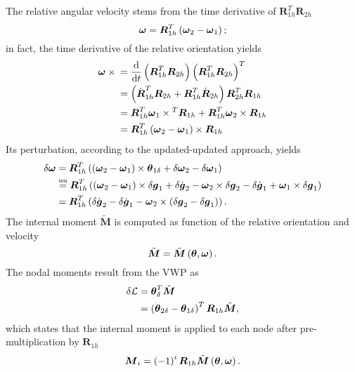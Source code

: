\documentclass[10pt,dvips,fleqn]{report}
\newcommand{\T}[1]{\boldsymbol{#1}}
\newcommand{\TT}[1]{\boldsymbol{#1}}
\newcommand{\equu}{\overset{\mathrm{uu}}{=}}
\begin{document}
The relative angular velocity stems from the time derivative
of $\TT{R}_{1h}^T\TT{R}_{2h}$
\begin{equation}
	\T{\omega} = \T{R}_{1h}^T\plbr{\T{\omega}_2 - \T{\omega}_1} ;
	\label{eq:deformable-hinge-attached-omega}
\end{equation}
in fact, the time derivative of the relative orientation yields
\begin{align}
	\T{\omega} \times{}
	&= \frac{\mathrm{d}}{\mathrm{d}t}\plbr{\T{R}_{1h}^T \T{R}_{2h}}\plbr{\T{R}_{1h}^T \T{R}_{2h}}^T \\
	&= \plbr{\dot{\T{R}}_{1h}^T \T{R}_{2h} + \T{R}_{1h}^T \dot{\T{R}}_{2h}} \T{R}_{2h}^T \T{R}_{1h} \\
	&= \T{R}_{1h}^T \T{\omega}_1 \times{}^T \T{R}_{1h} + \T{R}_{1h}^T \T{\omega}_2 \times \T{R}_{1h} \\
	&= \T{R}_{1h}^T \plbr{\T{\omega}_2 - \T{\omega}_1} \times \T{R}_{1h}
\end{align}
Its perturbation, according to the updated-updated approach, yields
\begin{align}
	\delta\T{\omega} &= \T{R}_{1h}^T\plbr{
		\plbr{\T{\omega}_2 - \T{\omega}_1} \times \T{\theta}_{1\delta}
		+ \delta\T{\omega}_2
		- \delta\T{\omega}_1
	} \\
	&\equu \T{R}_{1h}^T\plbr{
		\plbr{\T{\omega}_2 - \T{\omega}_1} \times \delta\T{g}_1
		+ \delta\dot{\T{g}}_2 - \T{\omega}_2 \times \delta\T{g}_2
		- \delta\dot{\T{g}}_1 + \T{\omega}_1 \times \delta\T{g}_1
	} \\
	&= \T{R}_{1h}^T\plbr{
		\delta\dot{\T{g}}_2
		- \delta\dot{\T{g}}_1
		- \T{\omega}_2 \times \plbr{\delta\T{g}_2 - \delta\T{g}_1}
	} .
\end{align}
The internal moment $\tilde{\T{M}}$ is computed as function
of the relative orientation and velocity
\begin{equation}
	\tilde{\T{M}} = \tilde{\T{M}}\plbr{\T{\theta}, \T{\omega}} .
\end{equation}
The nodal moments result from the VWP as
\begin{align}
	\delta\mathcal{L} &= \T{\theta}_{\delta}^T \tilde{\T{M}} \\
	&= \plbr{
		\T{\theta}_{2\delta} - \T{\theta}_{1\delta}
	}^T \T{R}_{1h} \tilde{\T{M}} ,
\end{align}
which states that the internal moment is applied to each node 
after pre-multiplication by $\T{R}_{1h}$
\begin{equation}
	\T{M}_i = \plbr{-1}^i \T{R}_{1h} \tilde{\T{M}}\plbr{\T{\theta}, \T{\omega}} .
\end{equation}
\end{document}
